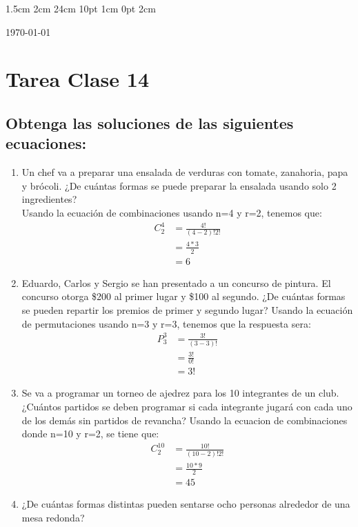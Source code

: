\documentclass[12pt,letterpaper]{report}
\begin{document}
\setmargins{2.5cm}      
{1.5cm}                     
{2cm}  
{24cm}                    
{10pt}                          
{1cm}                          
{0pt}                             
{2cm}
\begin{flushright}
\today
\end{flushright}
\vspace{-1.75cm}
\section*{Tarea Clase 14}
\subsection*{Obtenga las soluciones de las siguientes ecuaciones:}
\begin{enumerate}
\item Un chef va a preparar una ensalada de verduras con tomate, zanahoria, papa y brócoli. ¿De cuántas formas se puede preparar la ensalada usando solo 2 ingredientes?\\
Usando la ecuación de combinaciones usando n=4 y r=2, tenemos que:
\begin{align*}
    C^4_2&= \frac{4!}{(4-2)!2!}\\ &= \frac{4*3}{2}\\ &= 6
\end{align*}
\item Eduardo, Carlos y Sergio se han presentado a un concurso de pintura. El concurso otorga \$200 al primer lugar y  \$100 al segundo. ¿De cuántas formas se pueden repartir los premios de primer y segundo lugar?
Usando la ecuación de permutaciones usando n=3 y r=3, tenemos que la respuesta sera:
\begin{align*}
    P^3_3 &= \frac{3!}{(3-3)!}\\ &= \frac{3!}{0!}\\ &= 3!
\end{align*}
\item Se va a programar un torneo de ajedrez para los 10 integrantes de un club. ¿Cuántos partidos se deben programar si cada integrante jugará con cada uno de los demás sin partidos de revancha?
Usando la ecuacion de combinaciones donde n=10 y r=2, se tiene que:
\begin{align*}
    C^{10}_2&= \frac{10!}{(10-2)!2!}\\ &= \frac{10*9}{2}\\ &= 45
\end{align*}
\item ¿De cuántas formas distintas pueden sentarse ocho personas alrededor de una mesa redonda?

\end{enumerate}
\end{document}
